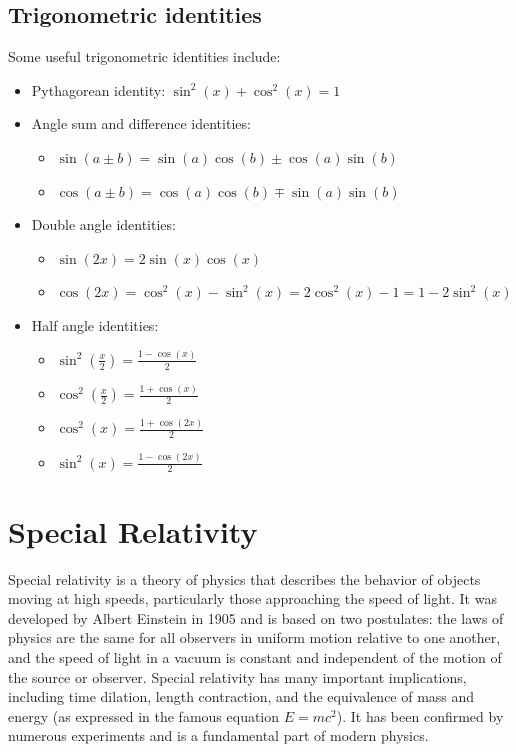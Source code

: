 \documentclass{article}
\begin{document}
\subsection{Trigonometric identities}
Some useful trigonometric identities include:
\begin{itemize}
    \item Pythagorean identity: $\sin^2(x) + \cos^2(x) = 1$
    \item Angle sum and difference identities:
    \begin{itemize}
        \item $\sin(a \pm b) = \sin(a)\cos(b) \pm \cos(a)\sin(b)$
        \item $\cos(a \pm b) = \cos(a)\cos(b) \mp \sin(a)\sin(b)$
    \end{itemize}
    \item Double angle identities:
    \begin{itemize}
        \item $\sin(2x) = 2\sin(x)\cos(x)$
        \item $\cos(2x) = \cos^2(x) - \sin^2(x) = 2\cos^2(x) - 1 = 1 - 2\sin^2(x)$
    \end{itemize}
    \item Half angle identities:
    \begin{itemize}
        \item $\sin^2\left(\frac{x}{2}\right) = \frac{1 - \cos(x)}{2}$
        \item $\cos^2\left(\frac{x}{2}\right) = \frac{1 + \cos(x)}{2}$
        \item $\cos^2(x) = \frac{1 + \cos(2x)}{2}$
        \item $\sin^2(x) = \frac{1 - \cos(2x)}{2}$
    \end{itemize}
\end{itemize}

\section{Special Relativity}
Special relativity is a theory of physics that describes the behavior of objects moving at high speeds, particularly those approaching the speed of light. It was developed by Albert Einstein in 1905 and is based on two postulates: the laws of physics are the same for all observers in uniform motion relative to one another, and the speed of light in a vacuum is constant and independent of the motion of the source or observer. Special relativity has many important implications, including time dilation, length contraction, and the equivalence of mass and energy (as expressed in the famous equation \(E = mc^2\)). It has been confirmed by numerous experiments and is a fundamental part of modern physics.
\end{document}
